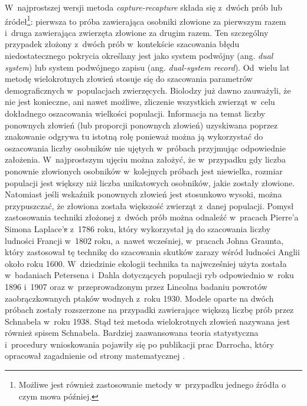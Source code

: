 \documentclass[12pt,a4paper]{article}
\providecommand{\DIFadd}[1]{{\protect\color{blue}\uwave{#1}}} %
\providecommand{\DIFdel}[1]{{\protect\color{red}\sout{#1}}}                      %
\providecommand{\DIFaddbegin}{} %
\providecommand{\DIFaddend}{} %
\providecommand{\DIFdelbegin}{} %
\providecommand{\DIFdelend}{} %
\begin{document}
W~najprostszej wersji metoda \textit{capture-recapture} składa się z~dwóch prób lub źródeł\footnote{Możliwe jest również zastosowanie metody w~przypadku jednego źródła o czym mowa później.}: pierwsza to próba zawierająca osobniki złowione za pierwszym razem i~druga zawierająca zwierzęta złowione za drugim razem. Ten szczególny przypadek złożony z~dwóch prób w~kontekście szacowania błędu niedostatecznego pokrycia określany jest jako system podwójny (ang. \textit{dual system}) lub system podwójnego zapisu (ang. \textit{dual-system record}). Od~wielu lat metodę wielokrotnych złowień stosuje się do szacowania parametrów demograficznych w~populacjach zwierzęcych. Biolodzy już dawno zauważyli, że nie jest konieczne, ani nawet możliwe, zliczenie wszystkich zwierząt w~celu dokładnego oszacowania wielkości populacji. Informacja na temat liczby ponownych złowień (lub proporcji ponownych złowień) uzyskiwana poprzez znakowanie odgrywa tu istotną rolę ponieważ można ją wykorzystać do oszacowania liczby osobników nie ujętych w~próbach przyjmując odpowiednie założenia.  
W~najprostszym ujęciu można założyć, że w~przypadku gdy liczba ponownie złowionych osobników w~kolejnych próbach jest niewielka, rozmiar populacji jest większy niż liczba unikatowych osobników, jakie zostały złowione. Natomiast jeśli wskaźnik ponownych złowień jest stosunkowo wysoki, można przypuszczać, że złowiona została większość zwierząt z~danej populacji. Pomysł zastosowania techniki złożonej z~dwóch prób można odnaleźć w~pracach Pierre’a Simona Laplace’\DIFdelbegin \DIFdel{s }\DIFdelend \DIFaddbegin \DIFadd{a }\DIFaddend z~1786 roku, który wykorzystał ją do szacowania liczby ludności Francji w~1802 roku, a~nawet wcześniej, w~pracach Johna Graunta, który zastosował tę technikę do szacowania skutków zarazy wśród ludności Anglii około roku 1600. W~dziedzinie ekologii technika ta najwcześniej użyta została w~badaniach Petersena i~Dahla dotyczących populacji ryb odpowiednio w~roku 1896 i~1907 oraz w~przeprowadzonym przez Lincolna badaniu powrotów zaobrączkowanych ptaków wodnych z~roku 1930. Modele oparte na dwóch próbach zostały rozszerzone na przypadki zawierające większą liczbę prób przez Schnabela w~roku 1938. Stąd też metoda wielokrotnych złowień nazywana jest również spisem Schnabela. Bardziej zaawansowana teoria statystyczna i~procedury wnioskowania pojawiły się po publikacji prac Darrocha, który opracował zagadnienie od strony matematycznej \citep[Rozdział 1]{bohning-bunge-hijden-2018}.
\end{document}
